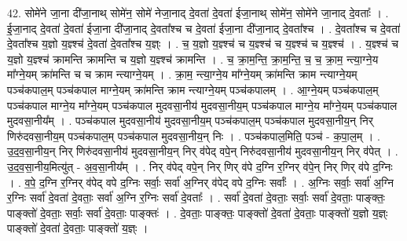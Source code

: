 \documentclass[17pt]{extarticle}
\begin{document}
42. सोमे॑ने जा॒ना दी॑जा॒नाथ् सोमे॑न॒ सोमे॑ नेजा॒नाद् दे॒वता॑ दे॒वता॑ ईजा॒नाथ् सोमे॑न॒ सोमे॑ने जा॒नाद् दे॒वताः᳚ । . ई॒जा॒नाद् दे॒वता॑ दे॒वता॑ ईजा॒ना दी॑जा॒नाद् दे॒वता᳚श्च च दे॒वता॑ ईजा॒ना दी॑जा॒नाद् दे॒वता᳚श्च । . दे॒वता᳚श्च च दे॒वता॑ दे॒वता᳚श्च य॒ज्ञो य॒ज्ञ्श्च॑ दे॒वता॑ दे॒वता᳚श्च य॒ज्ञ्ः । . च॒ य॒ज्ञो य॒ज्ञ्श्च॑ च य॒ज्ञ्श्च॑ च य॒ज्ञ्श्च॑ च य॒ज्ञ्श्च॑ । . य॒ज्ञ्श्च॑ च य॒ज्ञो य॒ज्ञ्श्च॑ क्रामन्ति क्रामन्ति च य॒ज्ञो य॒ज्ञ्श्च॑ क्रामन्ति । . च॒ क्रा॒म॒न्ति॒ क्रा॒म॒न्ति॒ च॒ च॒ क्रा॒म॒ न्त्या॒ग्ने॒य मा᳚ग्ने॒यम् क्रा॑मन्ति च च क्राम न्त्याग्ने॒यम् । . क्रा॒म॒ न्त्या॒ग्ने॒य मा᳚ग्ने॒यम् क्रा॑मन्ति क्राम न्त्याग्ने॒यम् पञ्च॑कपाल॒म् पञ्च॑कपाल माग्ने॒यम् क्रा॑मन्ति क्राम न्त्याग्ने॒यम् पञ्च॑कपालम् । . आ॒ग्ने॒यम् पञ्च॑कपाल॒म् पञ्च॑कपाल माग्ने॒य मा᳚ग्ने॒यम् पञ्च॑कपाल मुदवसा॒नीय॑ मुदवसा॒नीय॒म् पञ्च॑कपाल माग्ने॒य मा᳚ग्ने॒यम् पञ्च॑कपाल मुदवसा॒नीय᳚म् । . पञ्च॑कपाल मुदवसा॒नीय॑ मुदवसा॒नीय॒म् पञ्च॑कपाल॒म् पञ्च॑कपाल मुदवसा॒नीय॒न् निर् णिरु॑दवसा॒नीय॒म् पञ्च॑कपाल॒म् पञ्च॑कपाल मुदवसा॒नीय॒न् निः । . पञ्च॑कपाल॒मिति॒ पञ्च॑ - क॒पा॒ल॒म् । . उ॒द॒व॒सा॒नीय॒न् निर् णिरु॑दवसा॒नीय॑ मुदवसा॒नीय॒न् निर् व॑पेद् वपे॒न् निरु॑दवसा॒नीय॑ मुदवसा॒नीय॒न् निर् व॑पेत् । . उ॒द॒व॒सा॒नीय॒मित्यु॑त् - अ॒व॒सा॒नीय᳚म् । . निर् व॑पेद् वपे॒न् निर् णिर् व॑पे द॒ग्नि र॒ग्निर् व॑पे॒न् निर् णिर् व॑पे द॒ग्निः । . व॒पे॒ द॒ग्नि र॒ग्निर् व॑पेद् वपे द॒ग्निः सर्वाः॒ सर्वा॑ अ॒ग्निर् व॑पेद् वपे द॒ग्निः सर्वाः᳚ । . अ॒ग्निः सर्वाः॒ सर्वा॑ अ॒ग्नि र॒ग्निः सर्वा॑ दे॒वता॑ दे॒वताः॒ सर्वा॑ अ॒ग्नि र॒ग्निः सर्वा॑ दे॒वताः᳚ । . सर्वा॑ दे॒वता॑ दे॒वताः॒ सर्वाः॒ सर्वा॑ दे॒वताः॒ पाङ्क्तः॒ पाङ्क्तो॑ दे॒वताः॒ सर्वाः॒ सर्वा॑ दे॒वताः॒ पाङ्क्तः॑ । . दे॒वताः॒ पाङ्क्तः॒ पाङ्क्तो॑ दे॒वता॑ दे॒वताः॒ पाङ्क्तो॑ य॒ज्ञो य॒ज्ञ्ः पाङ्क्तो॑ दे॒वता॑ दे॒वताः॒ पाङ्क्तो॑ य॒ज्ञ्ः । \newline
\pagebreak
{}
\end{document}
